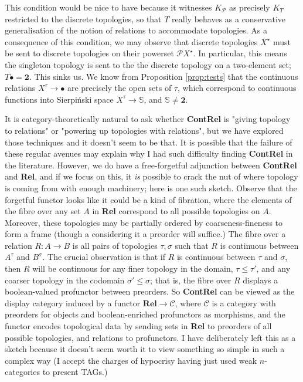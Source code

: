 This condition would be nice to have because it witnesses $K_{\mathcal{P}}$ as precisely $K_T$ restricted to the discrete topologies, so that $T$ really behaves as a conservative generalisation of the notion of relations to accommodate topologies. As a consequence of this condition, we may observe that discrete topologies $X^\star$ must be sent to discrete topologies on their powerset $\mathcal{P}X^\star$. In particular, this means the singleton topology is sent to the the discrete topology on a two-element set; $T\bullet = \textbf{2}$. This sinks us. We know from Proposition \ref{prop:tests} that the continuous relations $X^\tau \rightarrow \bullet$ are precisely the open sets of $\tau$, which correspond to continuous functions into Sierpi\'{n}ski space $X^\tau \rightarrow \mathbb{S}$, and $\mathbb{S} \neq \textbf{2}$.


It is category-theoretically natural to ask whether \textbf{ContRel} is "giving topology to relations" or "powering up topologies with relations", but we have explored those techniques and it doesn't seem to be that. It is possible that the failure of these regular avenues may explain why I had such difficulty finding \textbf{ContRel} in the literature. However, we do have a free-forgetful adjunction between \textbf{ContRel} and \textbf{Rel}, and if we focus on this, it \emph{is} possible to crack the nut of where topology is coming from with enough machinery; here is one such sketch. Observe that the forgetful functor looks like it could be a kind of fibration, where the elements of the fibre over any set $A$ in \textbf{Rel} correspond to all possible topologies on $A$. Moreover, these topologies may be partially ordered by coarseness-fineness to form a frame (though a considering it a preorder will suffice.) The fibre over a relation $R: A \rightarrow B$ is all pairs of topologies $\tau, \sigma$ such that $R$ is continuous between $A^\tau$ and $B^\sigma$. The crucial observation is that if $R$ is continuous between $\tau$ and $\sigma$, then $R$ will be continuous for any finer topology in the domain, $\tau \leq \tau'$, and any coarser topology in the codomain $\sigma' \leq \sigma$; that is, the fibre over $R$ displays a boolean-valued profunctor between preorders. So \textbf{ContRel} can be viewed as the display category induced by a functor $\textbf{Rel} \rightarrow \mathcal{C}$, where $\mathcal{C}$ is a category with preorders for objects and boolean-enriched profunctors as morphisms, and the functor encodes topological data by sending sets in \textbf{Rel} to preorders of all possible topologies, and relations to profunctors. I have deliberately left this as a sketch because it doesn't seem worth it to view something so simple in such a complex way (I accept the charges of hypocrisy having just used weak $n$-categories to present TAGs.)